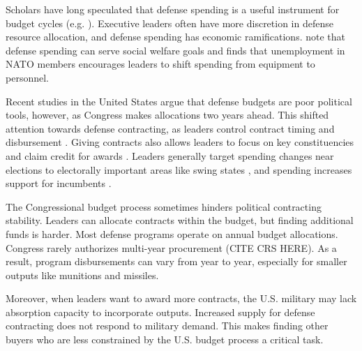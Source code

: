 \documentclass[12pt]{article}
\begin{document}
Scholars have long speculated that defense spending is a useful instrument for budget cycles (e.g. \cite{Tufte1978, Mintz1988}).
Executive leaders often have more discretion in defense resource allocation, and defense spending has economic ramifications.
\citet{WhittenWilliams2011} note that defense spending can serve social welfare goals and \citet{Becker2021} finds that unemployment in NATO members encourages leaders to shift spending from equipment to personnel.


Recent studies in the United States argue that defense budgets are poor political tools, however, as Congress makes allocations two years ahead.
This shifted attention towards defense contracting, as leaders control contract timing and disbursement \citep{Mayer1995, DerouenHeo2000}.
Giving contracts also allows leaders to focus on key constituencies and claim credit for awards \citep{DerouenHeo2000}. 
Leaders generally target spending changes near elections to electorally important areas like swing states \citep{KrinerReeves2015}, and spending increases support for incumbents \citep{KrinerReeves2012}.


%
%


The Congressional budget process sometimes hinders political contracting stability. 
Leaders can allocate contracts within the budget, but finding additional funds is harder. 
Most defense programs operate on annual budget allocations.
Congress rarely authorizes multi-year procurement (CITE CRS HERE). 
As a result, program disbursements can vary from year to year, especially for smaller outputs like munitions and missiles. 


Moreover, when leaders want to award more contracts, the U.S. military may lack absorption capacity to incorporate outputs.
Increased supply for defense contracting does not respond to military demand.
This makes finding other buyers who are less constrained by the U.S. budget process a critical task.
\end{document}
